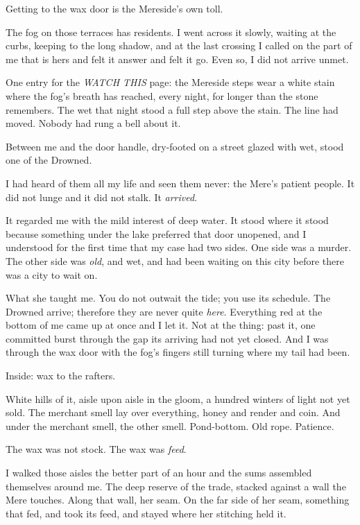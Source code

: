 \scenebreak

Getting to the wax door is the Mereside's own toll.

The fog on those terraces has residents. I went across it slowly, waiting at the curbs, keeping to the long shadow, and at the last crossing I called on the part of me that is hers and felt it answer and felt it go. Even so, I did not arrive unmet.

One entry for the \emph{WATCH THIS} page: the Mereside steps wear a white stain where the fog's breath has reached, every night, for longer than the stone remembers. The wet that night stood a full step above the stain. The line had moved. Nobody had rung a bell about it.

Between me and the door handle, dry-footed on a street glazed with wet, stood one of the Drowned.

I had heard of them all my life and seen them never: the Mere's patient people. It did not lunge and it did not stalk. It \emph{arrived}.

It regarded me with the mild interest of deep water. It stood where it stood because something under the lake preferred that door unopened, and I understood for the first time that my case had two sides. One side was a murder. The other side was \emph{old}, and wet, and had been waiting on this city before there was a city to wait on.

What she taught me. You do not outwait the tide; you use its schedule. The Drowned arrive; therefore they are never quite \emph{here}. Everything red at the bottom of me came up at once and I let it. Not at the thing: past it, one committed burst through the gap its arriving had not yet closed. And I was through the wax door with the fog's fingers still turning where my tail had been.

Inside: wax to the rafters.

White hills of it, aisle upon aisle in the gloom, a hundred winters of light not yet sold. The merchant smell lay over everything, honey and render and coin. And under the merchant smell, the other smell. Pond-bottom. Old rope. Patience.

The wax was not stock. The wax was \emph{feed}.

I walked those aisles the better part of an hour and the sums assembled themselves around me. The deep reserve of the trade, stacked against a wall the Mere touches. Along that wall, her seam. On the far side of her seam, something that fed, and took its feed, and stayed where her stitching held it.

